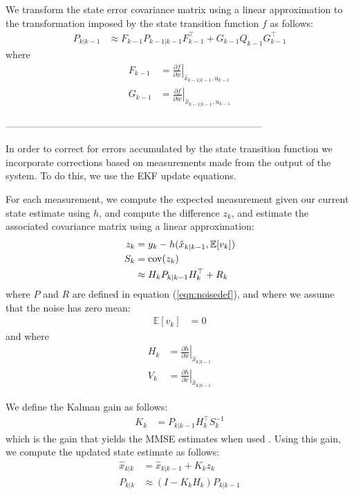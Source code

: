 \documentclass[]{article}
\begin{document}
{We transform the state error covariance matrix using a linear approximation to the transformation imposed by the state transition function $f$ as follows:
\begin{align}
	P_{k|k-1} &\approx F_{k-1} P_{k-1|k-1} F_{k-1}^\top + G_{k-1} Q_{k-1} G_{k-1}^\top
	\label{eqn:predictP}
\end{align}
where
\begin{align}
	F_{k-1} &= \left . \frac{\partial f}{\partial x} \right \vert _{\hat{x}_{k-1|k-1},u_{k-1}} \\
	G_{k-1} &= \left . \frac{\partial f}{\partial w} \right \vert _{\hat{x}_{k-1|k-1},u_{k-1}}
\end{align}

--------------------------------------------------------------------------------

In order to correct for errors accumulated by the state transition function we incorporate corrections based on measurements made from the output of the system. To do this, we use the \ac{EKF} update equations.

For each measurement, we compute the expected measurement given our current state estimate using $h$, and compute the difference $z_k$, and estimate the associated covariance matrix using a linear approximation:
\begin{align}
	z_k &= y_k - h(\hat{x}_{k|k-1}, \mathbb{E}[v_k]) \\
	S_k &= \operatorname{cov}(z_k) \notag \\
		&\approx H_k P_{k|k-1} H_k^\top + R_k
\end{align}
where $P$ and $R$ are defined in equation (\ref{eqn:noisedef}), and where we assume that the noise has zero mean:
\begin{align}
	\mathbb{E}[v_k] &= 0
\end{align}
and where
\begin{align}
	H_{k} &= \left . \frac{\partial h}{\partial x} \right \vert _{\hat{x}_{k|k-1}} \\
	V_{k} &= \left . \frac{\partial h}{\partial v} \right \vert _{\hat{x}_{k|k-1}}
\end{align}

We define the Kalman gain as follows:
\begin{align}
	K_k &= P_{k|k-1} H_k^\top S_k^{-1}
\end{align}
which is the gain that yields the \ac{MMSE} estimates when used \cite{BerkelyCourse}. Using this gain, we compute the updated state estimate as follows:
\begin{align}
	\hat{x}_{k|k} 	&= \hat{x}_{k|k-1} + K_k z_k \\
	P_{k|k} 		&\approx (I - K_k H_k) P_{k|k-1}
\end{align}

}
\end{document}
